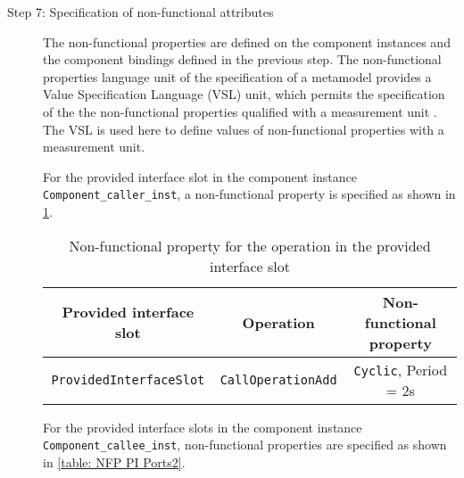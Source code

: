 \begin{description}
\item [Step 7: Specification of non-functional attributes] The non-functional properties are defined on the component instances and the component bindings defined in the previous step. The non-functional properties language unit of the specification of a metamodel provides a Value Specification Language (VSL) unit, which permits the specification of the the non-functional properties qualified with a measurement unit \cite{SpecMetamodel}. The VSL is used here to define values of non-functional properties with a measurement unit.

For the provided interface slot in the component instance \texttt{Component\allowbreak\_caller\allowbreak\_inst}, a non-functional property is specified as shown in \cref{table: NFP PI Ports1}.

\begin{table}[]
	\centering
	\caption{Non-functional property for the operation in the provided interface slot}
	\label{table: NFP PI Ports1}
	\begin{tabular}{lll}
		\hline
		\multicolumn{1}{|c|}{\textbf{Provided interface slot}} & \multicolumn{1}{c|}{\textbf{Operation}} & \multicolumn{1}{c|}{\textbf{Non-functional property}} \\ \hline
		\multicolumn{1}{|c|}{\texttt{ProvidedInterfaceSlot}} & \multicolumn{1}{c|}{\texttt{CallOperationAdd}} & \multicolumn{1}{c|}{\texttt{Cyclic}, Period = 2s} \\ \hline
	\end{tabular}
\end{table}

For the provided interface slots in the component instance \texttt{Component\allowbreak\_callee\_inst}, non-functional properties are specified as shown in \cref{table: NFP PI Ports2}.


\end{description}
